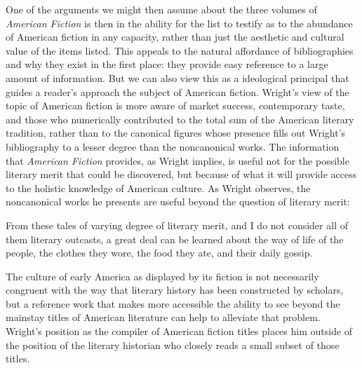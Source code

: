 One of the arguments we might then assume about the three volumes of \textit{American Fiction} is then in the ability for the list to testify as to the abundance of American fiction in any capacity, rather than just the aesthetic and cultural value of the items listed. This appeals to the natural affordance of bibliographies and why they exist in the first place: they provide easy reference to a large amount of information. But we can also view this as a ideological principal that guides a reader's approach the subject of American fiction. Wright's view of the topic of American fiction is more aware of market success, contemporary taste, and those who numerically contributed to the total sum of the American literary tradition, rather than to the canonical figures whose presence fills out Wright's bibliography to a lesser degree than the noncanonical works. The information that \textit{American Fiction} provides, as Wright implies, is useful not for the possible literary merit that could be discovered, but because of what it will provide access to the holistic knowledge of American culture. As Wright observes, the noncanonical works he presents are useful beyond the question of literary merit:
\begin{displayquote}
From these tales of varying degree of literary merit, and I do not consider all of them literary outcasts, a great deal can be learned about the way of life of the people, the clothes they wore, the food they ate, and their daily gossip. \autocite[77]{wright_few_1955}
\end{displayquote}
The culture of early America as displayed by its fiction is not necessarily congruent with the way that literary history has been constructed by scholars, but a reference work that makes more accessible the ability to see beyond the mainstay titles of American literature can help to alleviate that problem. Wright's position as the compiler of American fiction titles places him outside of the position of the literary historian who closely reads a small subset of those titles. 

